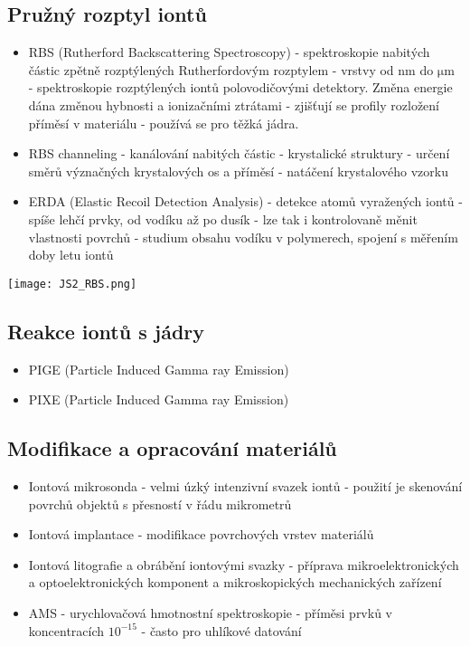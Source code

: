 \documentclass[../../main.tex]{subfiles}
\begin{document}
\subsection{Pružný rozptyl iontů}

\begin{itemize}
	\item RBS (Rutherford Backscattering Spectroscopy) - spektroskopie nabitých částic zpětně rozptýlených Rutherfordovým rozptylem - vrstvy od $\mathrm{nm}$ do $\mathrm{\mu m}$ - spektroskopie rozptýlených iontů polovodičovými detektory. Změna energie dána změnou hybnosti a ionizačními ztrátami - zjišťují se profily rozložení příměsí v materiálu - používá se pro těžká jádra.
	\item RBS channeling - kanálování nabitých částic - krystalické struktury - určení směrů význačných krystalových os a příměsí - natáčení krystalového vzorku
	\item ERDA (Elastic Recoil Detection Analysis) - detekce atomů vyražených iontů - spíše lehčí prvky, od vodíku až po dusík - lze tak i kontrolovaně měnit vlastnosti povrchů - studium obsahu vodíku v polymerech, spojení s měřením doby letu iontů
\end{itemize}

\begin{center}
	\texttt{[image: JS2\_RBS.png]}
\end{center}

\subsection{Reakce iontů s jádry}

\begin{itemize}
	\item PIGE (Particle Induced Gamma ray Emission)
	\item PIXE (Particle Induced Gamma ray Emission)
\end{itemize}

\subsection{Modifikace a opracování materiálů}

\begin{itemize}
	\item Iontová mikrosonda - velmi úzký intenzivní svazek iontů - použití  je skenování povrchů objektů s přesností v řádu mikrometrů
	\item Iontová implantace - modifikace povrchových vrstev materiálů
	\item Iontová litografie a obrábění iontovými svazky - příprava mikroelektronických a optoelektronických komponent a mikroskopických mechanických zařízení
	\item AMS - urychlovačová hmotnostní spektroskopie - příměsi prvků v koncentracích $10^{-15}$ - často pro uhlíkové datování
\end{itemize}
\end{document}

